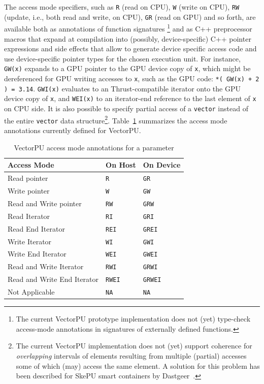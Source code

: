 The access mode specifiers,
such as \texttt{R} (read on CPU), \texttt{W} (write on CPU), \texttt{RW} 
(update, i.e., both read and write, on CPU), \texttt{GR} (read on GPU) and so forth,
are available both as annotations of function signatures%
\footnote{The current VectorPU prototype implementation does not
(yet) type-check access-mode annotations in signatures of externally defined functions.} and
as C++ preprocessor macros that expand at compilation into (possibly, device-specific) C++ pointer
expressions and side effects that allow to generate device specific access code
and use device-specific pointer types for the chosen execution unit. 
For instance, \texttt{GW(x)} expands to a GPU pointer to
the GPU device copy of \texttt{x},
which might be dereferenced for GPU writing accesses to \texttt{x},
such as the GPU code: \verb:*( GW(x) + 2 ) = 3.14:.
\texttt{GWI(x)} evaluates to an Thrust-compatible iterator onto the 
GPU device copy of \texttt{x}, and \texttt{WEI(x)} to an iterator-end reference
to the last element of \texttt{x} on CPU side.
%
It is also possible to specify partial access of a \verb:vector:
instead of the
entire \verb.vector. data structure\footnote{The current
VectorPU implementation does not (yet) support coherence for 
\emph{overlapping}
intervals of elements resulting from multiple (partial) accesses
some of which (may) access the same element.
A solution for this problem has been described for SkePU
smart containers by Dastgeer~\cite{Dastgeer-IJPP15}.}.
%
Table~\ref{tab:modes} summarizes the access mode annotations
currently defined for VectorPU.

\begin{table}
\caption{\label{tab:modes}VectorPU access mode annotations for a parameter  \cite{VectorPU-2017}}

\begin{center}
\begin{tabular}{|lll|}
\hline
Access Mode & On Host & On Device \\
\hline
Read pointer & \texttt{R} & \texttt{GR} \\
Write pointer & \texttt{W} & \texttt{GW} \\
Read and Write pointer & \texttt{RW} & \texttt{GRW} \\
Read Iterator & \texttt{RI} & \texttt{GRI} \\
Read End Iterator & \texttt{REI} & \texttt{GREI}\\
Write Iterator & \texttt{WI} & \texttt{GWI}\\
Write End Iterator & \texttt{WEI} & \texttt{GWEI}\\
Read and Write Iterator & \texttt{RWI} & \texttt{GRWI}\\
Read and Write End Iterator & \texttt{RWEI} & \texttt{GRWEI}\\
Not Applicable & \texttt{NA} & \texttt{NA} \\
\hline
\end{tabular}
\vspace{-3ex}
\end{center}
\end{table}


